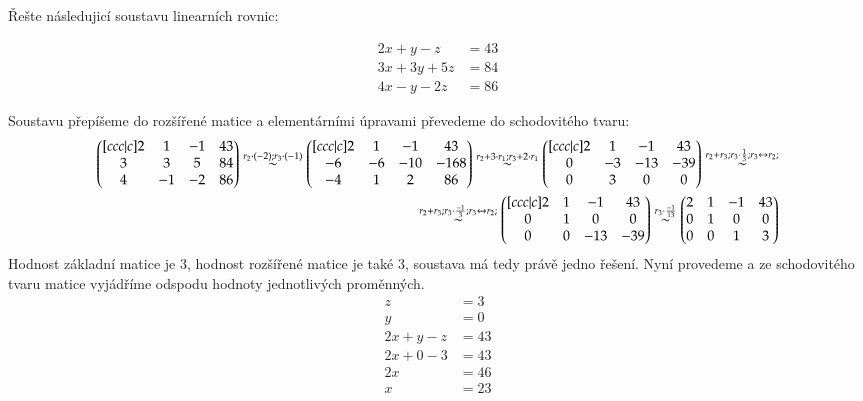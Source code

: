 \begin{example}
    Řešte následujicí soustavu linearních rovnic:

    \begin{align*}
        2x + y - z & = 43\\
        3x + 3y +5z &= 84\\
        4x - y - 2z &= 86
    \end{align*}

    Soustavu přepíšeme do rozšířené matice a elementárními úpravami
    převedeme do schodovitého tvaru:
    \begin{align*}
        \begin{pmatrix}[ccc|c]
            2 & 1 & -1 & 43\\
            3 & 3 & 5 & 84\\
            4 & -1 & -2 & 86
        \end{pmatrix} \overset{r_2  \cdot (-2); r_3 \cdot (-1)} \sim
        \begin{pmatrix}[ccc|c]
            2 & 1 & -1 & 43\\
            -6 & -6 & -10 & -168\\
            -4 & 1 & 2 & 86
        \end{pmatrix} \overset{r_2 + 3 \cdot r_1; r_3 + 2 \cdot r_1} \sim
        \begin{pmatrix}[ccc|c]
            2 & 1 & -1 & 43\\
            0 & -3 & -13 & -39\\
            0 & 3 & 0 & 0
        \end{pmatrix} \overset{r_2 + r_3; r_3 \cdot \frac{1}{3}; r_3 \leftrightarrow r_2; } \sim \\
        \overset{r_2 + r_3; r_3 \cdot \frac{-1}{3}; r_3 \leftrightarrow r_2; } \sim
        \begin{pmatrix}[ccc|c]
            2 & 1 & -1 & 43\\
            0 & 1 & 0 & 0\\
            0 & 0 & -13 & -39
        \end{pmatrix} \overset{r_3 \cdot \frac{-1}{13}} \sim
        \begin{pmatrix}
            2 & 1 & -1 & 43\\
            0 & 1 & 0 & 0\\
            0 & 0 & 1 & 3
        \end{pmatrix}
    \end{align*}
    Hodnost základní matice je 3, hodnost rozšířené matice je také 3, soustava má tedy právě jedno řešení.
    Nyní provedeme  a ze schodovitého tvaru matice vyjádříme odspodu hodnoty
    jednotlivých proměnných.
    \begin{align*}
        z &= 3\\
        y &= 0\\
        2x + y -z &= 43\\
        2x +0 -3 &= 43\\
        2x &=46\\
        x &= 23
    \end{align*}
\end{example}

